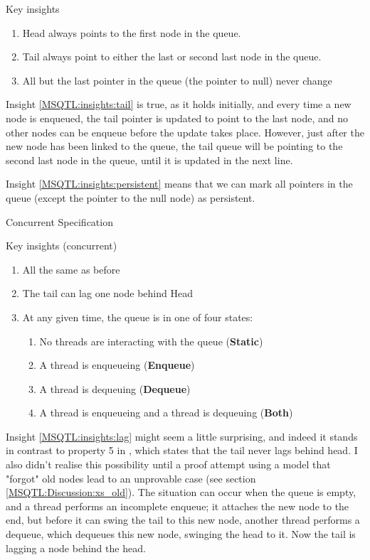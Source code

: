 \documentclass[twoside,11pt,openright]{report}
\begin{document}
Key insights
\begin{enumerate}
  \item\label{MSQTL:insights:head} Head always points to the first node in the queue.
  \item\label{MSQTL:insights:tail} Tail always point to either the last or second last node in the queue.
  \item\label{MSQTL:insights:persistent} All but the last pointer in the queue (the pointer to null) never change
\end{enumerate}

Insight \ref{MSQTL:insights:tail} is true, as it holds initially, and every time a new node is enqueued, the tail pointer is updated to point to the last node, and no other nodes can be enqueue before the update takes place. However, just after the new node has been linked to the queue, the tail queue will be pointing to the second last node in the queue, until it is updated in the next line.

Insight \ref{MSQTL:insights:persistent} means that we can mark all pointers in the queue (except the pointer to the null node) as persistent.



Concurrent Specification

Key insights (concurrent)
\begin{enumerate}
  \item All the same as before
  \item\label{MSQTL:insights:lag} The tail can lag one node behind Head
  \item\label{MSQTL:insights:states} At any given time, the queue is in one of four states:
    \begin{enumerate}
      \item\label{MSQTL:insights:state:static} No threads are interacting with the queue (\textbf{Static})
      \item\label{MSQTL:insights:state:enqueue} A thread is enqueueing (\textbf{Enqueue})
      \item\label{MSQTL:insights:state:dequeue} A thread is dequeuing (\textbf{Dequeue})
      \item\label{MSQTL:insights:state:both} A thread is enqueueing and a thread is dequeuing (\textbf{Both})
    \end{enumerate}
\end{enumerate}

Insight \ref{MSQTL:insights:lag} might seem a little surprising, and indeed it stands in contrast to property 5 in \cite{DBLP:conf/podc/MichaelS96}, which states that the tail never lags behind head. I also didn't realise this possibility until a proof attempt using a model that "forgot" old nodes lead to an unprovable case (see section \ref{MSQTL:Discussion:xs_old}). The situation can occur when the queue is empty, and a thread performs an incomplete enqueue; it attaches the new node to the end, but before it can swing the tail to this new node, another thread performs a dequeue, which dequeues this new node, swinging the head to it. Now the tail is lagging a node behind the head.
\end{document}
